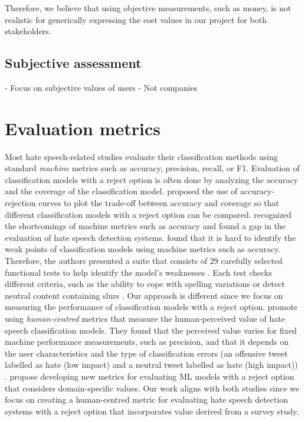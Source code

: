 Therefore, we believe that using objective measurements, such as money, is not realistic for generically expressing the cost values in our project for both stakeholders.

\subsection{Subjective assessment}
- Focus on subjective values of users
- Not companies


\section{Evaluation metrics}
Most hate speech-related studies evaluate their classification methods using standard \textit{machine} metrics such as accuracy, precision, recall, or F1.
% 
Evaluation of classification models with a reject option is often done by analyzing the accuracy and the coverage of the classification model.
%
\citet{nadeem2009reject} proposed the use of accuracy-rejection curves to plot the trade-off between accuracy and coverage so that different classification models with a reject option can be compared.
%
\citet{rottger2020hatecheck, casati2021value, olteanu2017limits} recognized the shortcomings of machine metrics such as accuracy and found a gap in the evaluation of hate speech detection systems.
%
\citet{rottger2020hatecheck} found that it is hard to identify the weak points of classification models using machine metrics such as accuracy.
%
Therefore, the authors presented a suite that consists of 29 carefully selected functional tests to help identify the model's weaknesses \citep{rottger2020hatecheck}.
%
Each test checks different criteria, such as the ability to cope with spelling variations or detect neutral content containing slurs \citep{rottger2020hatecheck}.
%
Our approach is different since we focus on measuring the performance of classification models with a reject option.
%
\citet{olteanu2017limits} promote using \textit{human-centred} metrics that measure the human-perceived value of hate speech classification models.
%
They found that the perceived value varies for fixed machine performance measurements, such as precision, and that it depends on the user characteristics and the type of classification errors (an offensive tweet labelled as hate (low impact) and a neutral tweet labelled as hate (high impact)) \citep{olteanu2017limits}.
%
\citet{casati2021value} propose developing new metrics for evaluating ML models with a reject option that considers domain-specific values.
%
Our work aligns with both studies since we focus on creating a human-centred metric for evaluating hate speech detection systems with a reject option that incorporates value derived from a survey study.
